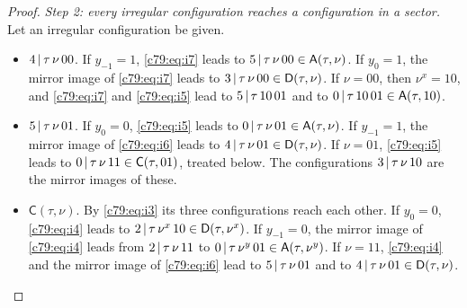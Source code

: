\begin{proof}
\emph{Step 2: every irregular configuration reaches a configuration in a sector.} Let an irregular configuration be given.
\begin{itemize}
\item $4\,|\,\tau\,\nu\,00$. If $y_{-1}=1$, \eqref{c79:eq:i7} leads to $5\,|\,\tau\,\nu\,00\in\mathsf A(\tau,\nu)$. If $y_0=1$, the mirror image of \eqref{c79:eq:i7} leads to $3\,|\,\tau\,\nu\,00\in\mathsf D(\tau,\nu)$. If $\nu=00$, then $\nu^x=10$, and \eqref{c79:eq:i7} and \eqref{c79:eq:i5} lead to $5\,|\,\tau\,10\,01$ and to $0\,|\,\tau\,10\,01\in\mathsf A(\tau,10)$.
\item $5\,|\,\tau\,\nu\,01$. If $y_0=0$, \eqref{c79:eq:i5} leads to $0\,|\,\tau\,\nu\,01\in\mathsf A(\tau,\nu)$. If $y_{-1}=1$, the mirror image of \eqref{c79:eq:i6} leads to $4\,|\,\tau\,\nu\,01\in\mathsf D(\tau,\nu)$. If $\nu=01$, \eqref{c79:eq:i5} leads to $0\,|\,\tau\,\nu\,11\in\mathsf C(\tau,01)$, treated below. The configurations $3\,|\,\tau\,\nu\,10$ are the mirror images of these.
\item $\mathsf C(\tau,\nu)$. By \eqref{c79:eq:i3} its three configurations reach each other. If $y_0=0$, \eqref{c79:eq:i4} leads to $2\,|\,\tau\,\nu^x\,10\in\mathsf D(\tau,\nu^x)$. If $y_{-1}=0$, the mirror image of \eqref{c79:eq:i4} leads from $2\,|\,\tau\,\nu\,11$ to $0\,|\,\tau\,\nu^y\,01\in\mathsf A(\tau,\nu^y)$. If $\nu=11$, \eqref{c79:eq:i4} and the mirror image of \eqref{c79:eq:i6} lead to $5\,|\,\tau\,\nu\,01$ and to $4\,|\,\tau\,\nu\,01\in\mathsf D(\tau,\nu)$.
\end{itemize}


\end{proof}
